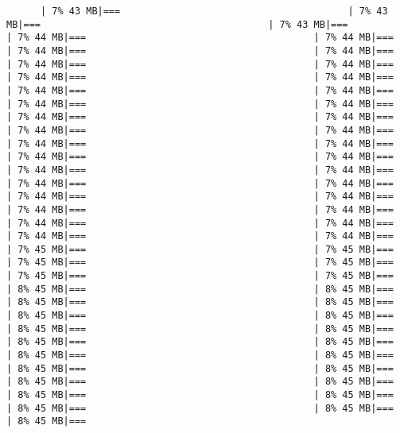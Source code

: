 \documentclass[
]{article}
\begin{document}
\begin{verbatim}
      | 7% 43 MB|===                                        | 7% 43 MB|===                                        | 7% 43 MB|===                                        | 7% 44 MB|===                                        | 7% 44 MB|===                                        | 7% 44 MB|===                                        | 7% 44 MB|===                                        | 7% 44 MB|===                                        | 7% 44 MB|===                                        | 7% 44 MB|===                                        | 7% 44 MB|===                                        | 7% 44 MB|===                                        | 7% 44 MB|===                                        | 7% 44 MB|===                                        | 7% 44 MB|===                                        | 7% 44 MB|===                                        | 7% 44 MB|===                                        | 7% 44 MB|===                                        | 7% 44 MB|===                                        | 7% 44 MB|===                                        | 7% 44 MB|===                                        | 7% 44 MB|===                                        | 7% 44 MB|===                                        | 7% 44 MB|===                                        | 7% 44 MB|===                                        | 7% 44 MB|===                                        | 7% 44 MB|===                                        | 7% 44 MB|===                                        | 7% 44 MB|===                                        | 7% 44 MB|===                                        | 7% 44 MB|===                                        | 7% 44 MB|===                                        | 7% 44 MB|===                                        | 7% 44 MB|===                                        | 7% 44 MB|===                                        | 7% 45 MB|===                                        | 7% 45 MB|===                                        | 7% 45 MB|===                                        | 7% 45 MB|===                                        | 7% 45 MB|===                                        | 7% 45 MB|===                                        | 8% 45 MB|===                                        | 8% 45 MB|===                                        | 8% 45 MB|===                                        | 8% 45 MB|===                                        | 8% 45 MB|===                                        | 8% 45 MB|===                                        | 8% 45 MB|===                                        | 8% 45 MB|===                                        | 8% 45 MB|===                                        | 8% 45 MB|===                                        | 8% 45 MB|===                                        | 8% 45 MB|===                                        | 8% 45 MB|===                                        | 8% 45 MB|===                                        | 8% 45 MB|===                                        | 8% 45 MB|===                                        | 8% 45 MB|===                                        | 8% 45 MB|===                                        | 8% 45 MB|===                                        | 8% 45 MB|===                                        | 8% 45 MB|===     
\end{verbatim}
\end{document}
